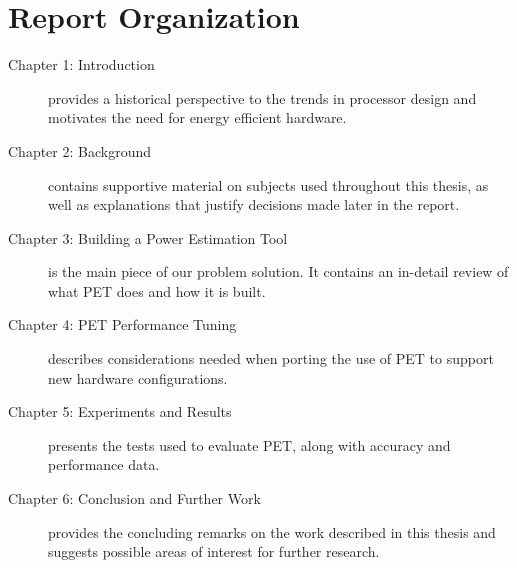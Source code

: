 \section{Report Organization}

\begin{description}
    \item[Chapter 1: Introduction] provides a historical perspective to the
        trends in processor design and motivates the need for energy efficient
        hardware.
    \item[Chapter 2: Background] contains supportive material on subjects used
        throughout this thesis, as well as explanations that justify decisions
        made later in the report.
    \item[Chapter 3: Building a Power Estimation Tool] is the main piece of our
        problem solution. It contains an in-detail review of what PET does and
        how it is built.
    \item[Chapter 4: PET Performance Tuning] describes considerations needed
        when porting the use of PET to support new hardware configurations.
    \item[Chapter 5: Experiments and Results] presents the tests used to
        evaluate PET, along with accuracy and performance data.
    \item[Chapter 6: Conclusion and Further Work] provides the concluding remarks on the work
        described in this thesis and suggests possible areas of interest for
        further research.
\end{description}

